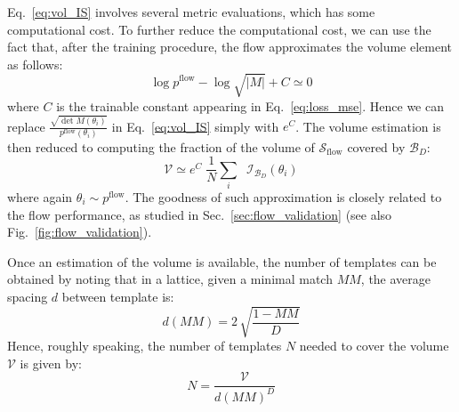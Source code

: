 \documentclass[twocolumn,showpacs,preprintnumbers,nofootinbib,prd,
superscriptaddress,10pt]{revtex4-2}
\begin{document}
Eq.~\eqref{eq:vol_IS} involves several metric evaluations, which has some computational cost.
To further reduce the computational cost, we can use the fact that, after the training procedure, the flow approximates the volume element as follows:
\begin{equation}
	\log p^\text{flow} - \log\sqrt{|M|} + C \simeq 0
\end{equation}
where $C$ is the trainable constant appearing in Eq.~\eqref{eq:loss_mse}.
Hence we can replace $\frac{\sqrt{\det M(\theta_i)}}{p^\text{flow}(\theta_i)}$ in Eq.~\eqref{eq:vol_IS} simply with $e^C$.
The volume estimation is then reduced to computing the fraction of the volume of $\mathcal{S}_\text{flow}$ covered by $\mathcal{B}_D$:
\begin{equation}
	\mathcal{V} \simeq e^C \; \frac{1}{N}  \sum_i \; \; \mathcal{I}_{\mathcal{B}_D}(\theta_i)
\end{equation}
where again $\theta_i \sim p^\text{flow}$.
The goodness of such approximation is closely related to the flow performance, as studied in Sec.~\ref{sec:flow_validation} (see also Fig.~\ref{fig:flow_validation}).

Once an estimation of the volume is available, the number of templates can be obtained by noting \cite{owen_metric} that in a lattice, given a minimal match $MM$, the average spacing $d$ between template is:
\begin{equation}
	d(MM) = 2 \, \sqrt{\frac{1-MM}{D}}
\end{equation}
Hence, roughly speaking, the number of templates $N$ needed to cover the volume $\mathcal{V}$ is given by:
\begin{equation} \label{eq:N_templates}
	N = \frac{\mathcal{V}}{d(MM)^D}
\end{equation}
\end{document}
